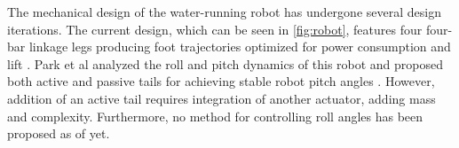 The mechanical design of the water-running robot has undergone several design iterations. The current design, which can be seen in \ref{fig:robot}, features four four-bar linkage legs producing  foot trajectories optimized for power consumption and lift \cite{floyd2008design}. Park et al analyzed the roll and pitch dynamics of this robot and proposed both active and passive tails for achieving stable robot pitch angles \cite{park2010roll}. However, addition of an active tail requires integration of another actuator, adding mass and complexity. Furthermore, no method for controlling roll angles has been proposed as of yet.

